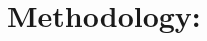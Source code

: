 \documentclass[amsmath,amssymb,nofootinbib,12pt,preprint]{revtex4}
\begin{document}
%

\section{ Methodology:}
\end{document}
